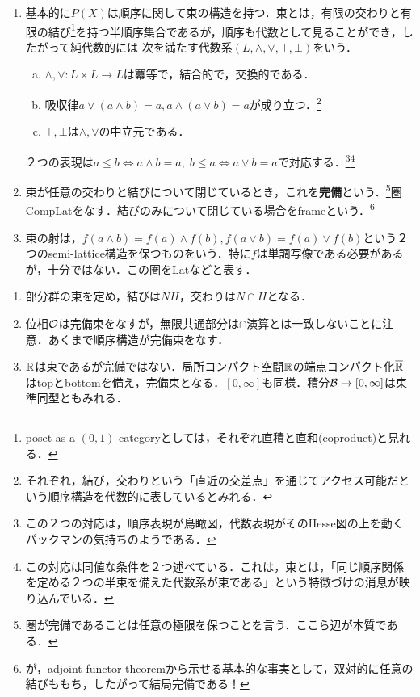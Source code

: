 \documentclass[uplatex, dvipdfmx]{jsreport}
\begin{document}
\begin{definition}\mbox{}
    \begin{enumerate}
        \item 
    基本的に$P(X)$は順序に関して束の構造を持つ．束とは，有限の交わりと有限の結び\footnote{poset as a $(0,1)$-categoryとしては，それぞれ直積と直和(coproduct)と見れる．}を持つ半順序集合であるが，順序も代数として見ることができ，したがって純代数的には
    次を満たす代数系$(L,\land,\lor,\top,\bot)$をいう．
    \begin{enumerate}[(a)]
        \item $\land,\lor:L\times L\to L$は冪等で，結合的で，交換的である．
        \item 吸収律$a\lor(a\land b)=a,a\land(a\lor b)=a$が成り立つ．\footnote{それぞれ，結び，交わりという「直近の交差点」を通じてアクセス可能だという順序構造を代数的に表しているとみれる．}
        \item $\top,\bot$は$\land,\lor$の中立元である．
    \end{enumerate}
    ２つの表現は$a\le b\Leftrightarrow a\land b=a,\;b\le a\Leftrightarrow a\lor b=a$で対応する．\footnote{この２つの対応は，順序表現が鳥瞰図，代数表現がそのHesse図の上を動くパックマンの気持ちのようである．}\footnote{この対応は同値な条件を２つ述べている．これは，束とは，「同じ順序関係を定める２つの半束を備えた代数系が束である」という特徴づけの消息が映り込んでいる．}
    \item 束が任意の交わりと結びについて閉じているとき，これを\textbf{完備}という．\footnote{圏が完備であることは任意の極限を保つことを言う．ここら辺が本質である．}圏CompLatをなす．結びのみについて閉じている場合をframeという．\footnote{が，adjoint functor theoremから示せる基本的な事実として，双対的に任意の結びももち，したがって結局完備である！}
    \item 束の射は，$f(a\land b)=f(a)\land f(b),f(a\lor b)=f(a)\lor f(b)$という２つのsemi-lattice構造を保つものをいう．特に$f$は単調写像である必要があるが，十分ではない．この圏をLatなどと表す．
    \end{enumerate}
\end{definition}

\begin{example}[束と束準同型の例]\mbox{}\label{exp-lattice}
    \begin{enumerate}
        \item 部分群の束を定め，結びは$NH$，交わりは$N\cap H$となる．
        \item 位相$\mathcal{O}$は完備束をなすが，無限共通部分は$\cap$演算とは一致しないことに注意．あくまで順序構造が完備束をなす．
        \item $\mathbb{R}$は束であるが完備ではない．局所コンパクト空間$\mathbb{R}$の端点コンパクト化$\overline{\mathbb{R}}$はtopとbottomを備え，完備束となる．$[0,\infty]$も同様．積分$\mathcal{B}\to[0,\infty]$は束準同型ともみれる．
    \end{enumerate}
\end{example}
\end{document}

